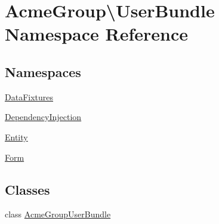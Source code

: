 \hypertarget{namespace_acme_group_1_1_user_bundle}{\section{Acme\+Group\textbackslash{}User\+Bundle Namespace Reference}
\label{namespace_acme_group_1_1_user_bundle}
}
\subsection*{Namespaces}
\begin{DoxyCompactItemize}
\item 
 \hyperlink{namespace_acme_group_1_1_user_bundle_1_1_data_fixtures}{Data\+Fixtures}
\item 
 \hyperlink{namespace_acme_group_1_1_user_bundle_1_1_dependency_injection}{Dependency\+Injection}
\item 
 \hyperlink{namespace_acme_group_1_1_user_bundle_1_1_entity}{Entity}
\item 
 \hyperlink{namespace_acme_group_1_1_user_bundle_1_1_form}{Form}
\end{DoxyCompactItemize}
\subsection*{Classes}
\begin{DoxyCompactItemize}
\item 
class \hyperlink{class_acme_group_1_1_user_bundle_1_1_acme_group_user_bundle}{Acme\+Group\+User\+Bundle}
\end{DoxyCompactItemize}
